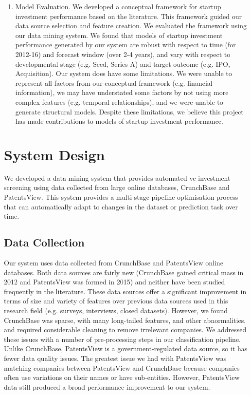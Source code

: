 \documentclass[../thesis/thesis.tex]{subfiles}
\begin{document}
\begin{enumerate}
\item Model Evaluation. We developed a conceptual framework for startup investment performance based on the literature. This framework guided our data source selection and feature creation. We evaluated the framework using our data mining system. We found that models of startup investment performance generated by our system are robust with respect to time (for 2012-16) and forecast window (over 2-4 years), and vary with respect to developmental stage (e.g. Seed, Series A) and target outcome (e.g. IPO, Acquisition). Our system does have some limitations. We were unable to represent all factors from our conceptual framework (e.g. financial information), we may have understated some factors by not using more complex features (e.g. temporal relationships), and we were unable to generate structural models. Despite these limitations, we believe this project has made contributions to models of startup investment performance.

\end{enumerate}

\section{System Design}

We developed a data mining system that provides automated \gls{vc} investment screening using data collected from large online databases, CrunchBase and PatentsView. This system provides a multi-stage pipeline optimisation process that can automatically adapt to changes in the dataset or prediction task over time.

\subsection{Data Collection}

Our system uses data collected from CrunchBase and PatentsView online databases. Both data sources are fairly new (CrunchBase gained critical mass in 2012 and PatentsView was formed in 2015) and neither have been studied frequently in the literature. These data sources offer a significant improvement in terms of size and variety of features over previous data sources used in this research field (e.g. surveys, interviews, closed datasets). However, we found CrunchBase was sparse, with many long-tailed features, and other abnormalities, and required considerable cleaning to remove irrelevant companies. We addressed these issues with a number of pre-processing steps in our classification pipeline. Unlike CrunchBase, PatentsView is a government-regulated data source, so it has fewer data quality issues. The greatest issue we had with PatentsView was matching companies between PatentsView and CrunchBase because companies often use variations on their names or have sub-entities. However, PatentsView data still produced a broad performance improvement to our system.
\end{document}
